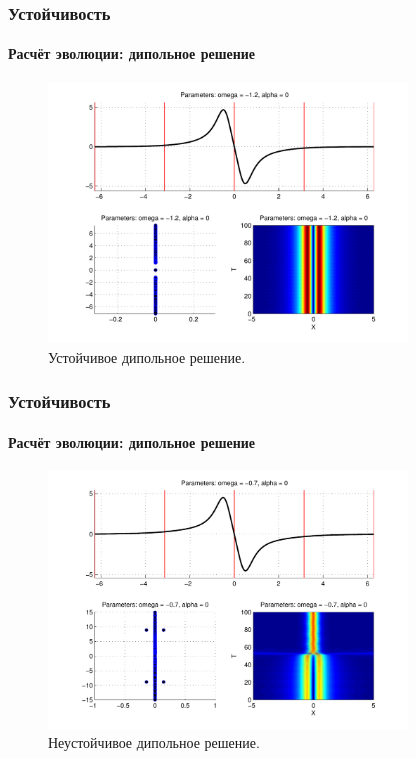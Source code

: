 \documentclass{beamer}
\begin{document}
\begin{frame}
	\frametitle{Устойчивость}
	\framesubtitle{Расчёт эволюции: дипольное решение}
	
	\begin{figure}
		\includegraphics[width=0.85\textwidth]{pic/dipole_solution_stable.pdf}
		\caption{Устойчивое дипольное решение.}
		\label{pic:dipole_solution_stable}
	\end{figure}
\end{frame}

\begin{frame}
	\frametitle{Устойчивость}
	\framesubtitle{Расчёт эволюции: дипольное решение}
	
	\begin{figure}
		\includegraphics[width=0.85\textwidth]{pic/dipole_solution_unstable.pdf}
		\caption{Неустойчивое дипольное решение.}
		\label{pic:dipole_solution_unstable}
	\end{figure}
\end{frame}
\end{document}
